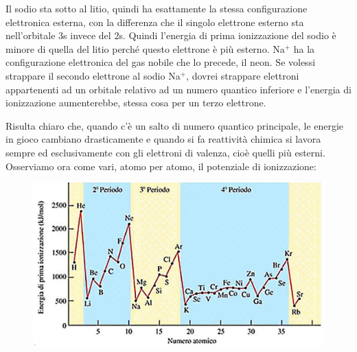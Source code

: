 Il sodio sta sotto al litio, quindi ha esattamente la stessa configurazione elettronica esterna, con la differenza che il singolo elettrone esterno sta nell'orbitale 3s invece del 2s. Quindi l'energia di prima ionizzazione del sodio è minore di quella del litio perché questo elettrone è più esterno. Na$^+$ ha la configurazione elettronica del gas nobile che lo precede, il neon. Se volessi strappare il secondo elettrone al sodio Na$^+$, dovrei strappare elettroni appartenenti ad un orbitale relativo ad un numero quantico inferiore e l'energia di ionizzazione aumenterebbe, stessa cosa per un terzo elettrone. 

Risulta chiaro che, quando c'è un salto di numero quantico principale, le energie in gioco cambiano drasticamente e quando si fa reattività chimica si lavora sempre ed esclusivamente con gli elettroni di valenza, cioè quelli più esterni.\\

Osserviamo ora come vari, atomo per atomo, il potenziale di ionizzazione:

\begin{figure}[htp]
    \centering
    \includegraphics[width=12cm]{immagini/potenziale-di-ionizzazione.png}
\end{figure}

